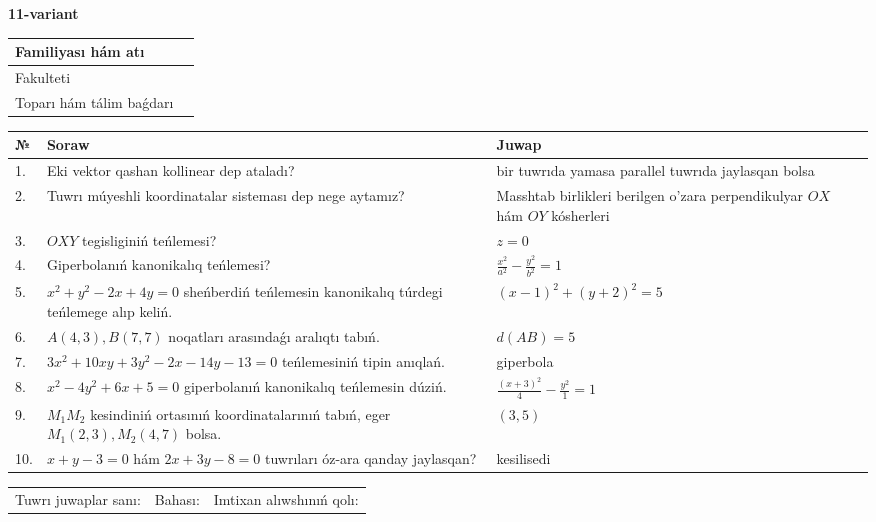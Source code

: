 \documentclass{article}
\begin{document}
\egroup

\newpage


\textbf{11-variant}\\

\bgroup
\def\arraystretch{1.6} %

\begin{tabular}{|m{5.7cm}|m{9.5cm}|}
\hline
Familiyası hám atı & \\
\hline
Fakulteti  & \\
\hline
Toparı hám tálim baǵdarı  & \\
\hline
\end{tabular}

\vspace{1cm}

\begin{tabular}{|m{0.7cm}|m{10cm}|m{4cm}|}
\hline
№ & Soraw & Juwap \\
\hline
1. & Eki vektor qashan kollinear dep ataladı? & bir tuwrıda yamasa parallel tuwrıda jaylasqan bolsa \\
\hline
2. & Tuwrı múyeshli koordinatalar sisteması dep nege aytamız? & Masshtab birlikleri berilgen o'zara perpendikulyar $OX$ hám $OY$ kósherleri \\
\hline
3. & $OXY$ tegisliginiń teńlemesi? & $z=0$ \\
\hline
4. & Giperbolanıń kanonikalıq teńlemesi? & $\frac{x^2}{a^2}-\frac{y^2}{b^2}=1$ \\
\hline
5. & $x^{2}+y^{2}-2x+4y=0$ sheńberdiń teńlemesin kanonikalıq túrdegi teńlemege alıp keliń. & $(x-1)^{2}+(y+2)^{2}=5$ \\
\hline
6. & $A(4, 3), B(7, 7)$ noqatları arasındaǵı aralıqtı tabıń. & $d(AB)=5$ \\
\hline
7. & $3x^{2}+10xy+3y^{2}-2x-14y-13=0$ teńlemesiniń tipin anıqlań. & giperbola \\
\hline
8. & $x^{2}-4y^{2}+6x+5=0$ giperbolanıń kanonikalıq teńlemesin dúziń. & $\frac{(x+3)^{2}}{4}-\frac{y^{2}}{1}=1$ \\
\hline
9. & $M_{1}M_{2}$ kesindiniń ortasınıń koordinatalarınıń tabıń, eger $M_{1} (2, 3), M_{2} (4, 7)$ bolsa. & $(3,5)$ \\
\hline
10. & $x+y-3=0$ hám $2x+3y-8=0$ tuwrıları óz-ara qanday jaylasqan? & kesilisedi \\
\hline
\end{tabular}

\vspace{1cm}

\begin{tabular}{lll}
Tuwrı juwaplar sanı: \underline{\hspace{1.5cm}} & 
Bahası: \underline{\hspace{1.5cm}} & 
Imtixan alıwshınıń qolı: \underline{\hspace{2cm}} \\
\end{tabular}
\end{document}
